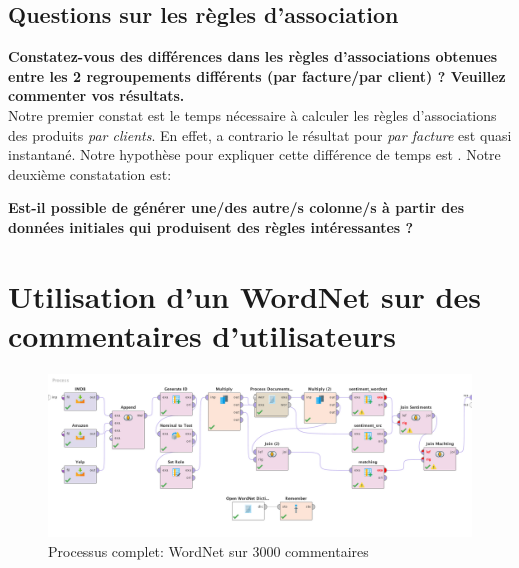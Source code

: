 \documentclass[a4paper]{article}
\begin{document}
\subsection{Questions sur les règles d’association}
\textbf{Constatez-vous des différences dans les règles d'associations obtenues entre les 2 regroupements différents (par facture/par client) ? Veuillez commenter vos résultats.}
\\
Notre premier constat est le temps nécessaire à calculer les règles d'associations des produits \textit{par clients}. En effet, a contrario le résultat pour \textit{par facture} est quasi instantané. Notre hypothèse pour expliquer cette différence de temps est .
Notre deuxième constatation est: 

\vspace{6pt}
\textbf{Est-il possible de générer une/des autre/s colonne/s à partir des données initiales qui produisent des règles intéressantes ?}
\\

\vspace{6pt}

\pagebreak
\section{Utilisation d'un WordNet sur des commentaires d’utilisateurs}

\begin{figure}[H]
	\includegraphics[width=\linewidth]{imgs/part_3/3_full_process}
	\caption{Processus complet: WordNet sur 3000 commentaires }
	\label{fig:3_full_process}
\end{figure}
\end{document}
